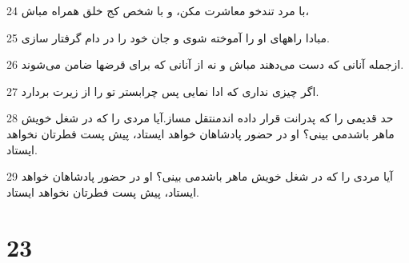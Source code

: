 \par 24 با مرد تندخو معاشرت مکن، و با شخص کج خلق همراه مباش،
\par 25 مبادا راههای او را آموخته شوی و جان خود را در دام گرفتار سازی.
\par 26 از‌جمله آنانی که دست می‌دهند مباش و نه از آنانی که برای قرضها ضامن می‌شوند.
\par 27 اگر چیزی نداری که ادا نمایی پس چرابستر تو را از زیرت بردارد.
\par 28 حد قدیمی را که پدرانت قرار داده اندمنتقل مساز.آیا مردی را که در شغل خویش ماهر باشدمی بینی؟ او در حضور پادشاهان خواهد ایستاد، پیش پست فطرتان نخواهد ایستاد.
\par 29 آیا مردی را که در شغل خویش ماهر باشدمی بینی؟ او در حضور پادشاهان خواهد ایستاد، پیش پست فطرتان نخواهد ایستاد.
 
\chapter{23}

